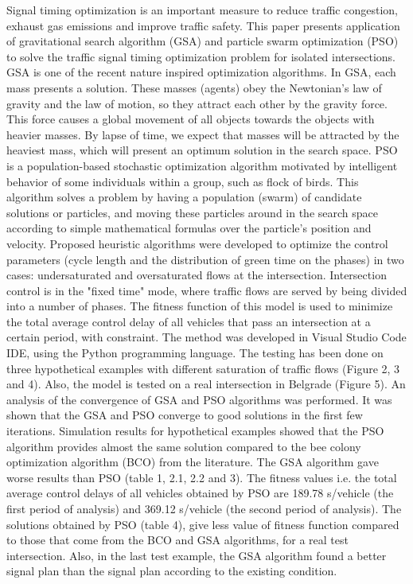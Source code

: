 \begin{AbstractEng}
Signal timing optimization is an important measure to reduce traffic congestion, exhaust gas emissions and improve traffic safety. This paper presents application of gravitational search algorithm (GSA) and particle swarm optimization (PSO) to solve the traffic signal timing optimization problem for isolated intersections. GSA is one of the recent nature inspired optimization algorithms. In GSA, each mass presents a solution. These masses (agents) obey the Newtonian's law of gravity and the law of motion, so they attract each other by the gravity force. This force causes a global movement of all objects towards the objects with heavier masses. By lapse of time, we expect that masses will be attracted by the heaviest mass, which will present an optimum solution in the search space. PSO is a population-based stochastic optimization algorithm motivated by intelligent behavior of some individuals within a group, such as flock of birds. This algorithm solves a problem by having a population (swarm) of candidate solutions or particles, and moving these particles around in the search space according to simple mathematical formulas over the particle's position and velocity. Proposed heuristic algorithms were developed to optimize the control parameters (cycle length and the distribution of green time on the phases) in two cases: undersaturated and oversaturated flows at the intersection. Intersection control is in the "fixed time" mode, where traffic flows are served by being divided into a number of phases. The fitness function of this model is used to minimize the total average control delay of all vehicles that pass an intersection at a certain period, with constraint. The method was developed in Visual Studio Code IDE, using the Python programming language. The testing has been done on three hypothetical examples with different saturation of traffic flows (Figure 2, 3 and 4). Also, the model is tested on a real intersection in Belgrade (Figure 5). An analysis of the convergence of GSA and PSO algorithms was performed. It was shown that the GSA and PSO converge to good solutions in the first few iterations. Simulation results for hypothetical examples showed that the PSO algorithm provides almost the same solution compared to the bee colony optimization algorithm (BCO) from the literature. The GSA algorithm gave worse results than PSO (table 1, 2.1, 2.2 and 3). The fitness values i.e. the total average control delays of all vehicles obtained by PSO are 189.78 s/vehicle (the first period of analysis) and 369.12 s/vehicle (the second period of analysis). The solutions obtained by PSO (table 4), give less value of fitness function compared to those that come from the BCO and GSA algorithms, for a real test intersection. Also, in the last test example, the GSA algorithm found a better signal plan than the signal plan according to the existing condition. 
\end{AbstractEng}
\StartDoublePaper
\label{rac.aleksandra}

